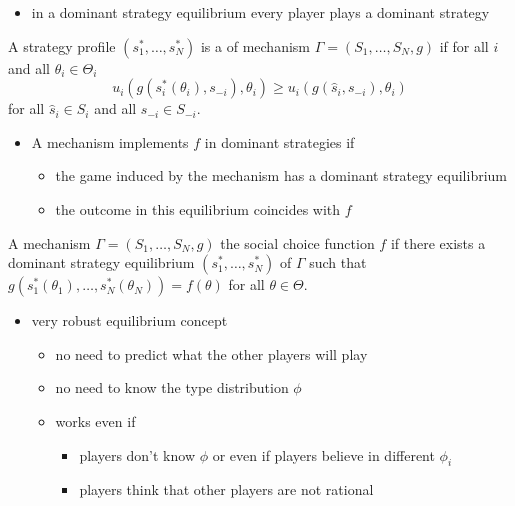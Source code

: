 \documentclass[english,handout]{beamer}		%
\def\lyxframeend{} %
\begin{document}
\begin{itemize}
	\item in a dominant strategy equilibrium every player plays a dominant strategy
\end{itemize}
\begin{definition}
	A strategy profile $(s_1^*,\dots,s_N^*)$ is a  of mechanism  $\Gamma=(S_{1},\dots,S_{N},g)$ if for all $i$ and all $\theta_{i}\in \Theta_{i}$
	$$ u_{i}(g(s_{i}^{*}(\theta_{i}),s_{-i}),\theta_{i})\geq u_{i}(g(\hat s_{i},s_{-i}),\theta_{i})$$
	for all $\hat s_{i}\in S_{i}$ and all $s_{-i}\in S_{-i}$.
\end{definition}
\lyxframeend


\begin{itemize}
	\item A mechanism implements $f$ in dominant strategies if
	\begin{itemize}
		\item the game induced by the mechanism has a dominant strategy equilibrium
		\item the outcome in this equilibrium coincides with $f$
	\end{itemize}
\end{itemize}
\begin{definition}
	A mechanism $\Gamma=(S_{1},\dots,S_{N},g)$  the social choice function $f$  if there exists a dominant strategy equilibrium $(s_1^*,\dots,s_N^*)$ of $\Gamma$ such that $g(s_1^*(\theta_{1}),\dots,s_N^*(\theta_{N}))=f(\theta)$ for all $\theta\in\Theta$.
\end{definition}
\lyxframeend


\begin{itemize}
	\item very robust equilibrium concept
	\begin{itemize}
		\item no need to predict what the other players will play
		\item no need to know the type distribution $\phi$
		\item works even if
		\begin{itemize}
			\item players don't know $\phi$ or even if players believe in different $\phi_{i}$
			\item players think that other players are not rational
		\end{itemize}
	\end{itemize}
\end{itemize}
\lyxframeend
\end{document}
